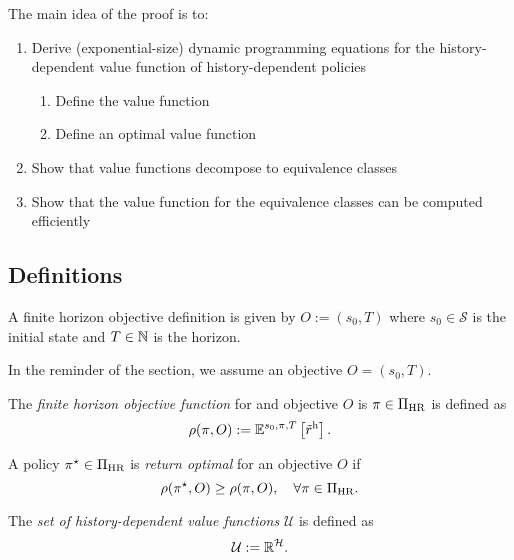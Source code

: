 The main idea of the proof is to:
\begin{enumerate}
\item Derive (exponential-size) dynamic programming equations for the history-dependent value function of history-dependent policies
  \begin{enumerate}
    \item Define the value function
    \item Define an optimal value function
  \end{enumerate}
\item Show that value functions decompose to equivalence classes
\item Show that the value function for the equivalence classes can be computed efficiently
\end{enumerate}

\subsection{Definitions}

\begin{definition} \label{def:ObjectiveFH}
  A finite horizon objective definition is given by $O := (s_0, T)$ where $s_0\in \mathcal{S}$ is the initial state and $T\in \mathbb{N}$ is the horizon.
   \leanok
\end{definition}

In the reminder of the section, we assume an objective $O = (s_0, T)$.
\begin{definition} \label{sec:objective-fh}
  The \emph{finite horizon objective function} for and objective $O$ is $\pi\in \Pi_{\mathrm{HR}}$ is defined as
  \[
    \rho(\pi, O)
    :=
    \mathbb{E}^{s_0, \pi, T} \left[\tilde{r}^{\mathrm{h}} \right].
  \]
   \leanok
\end{definition}

\begin{definition}\label{def:optimal-fh}
  A policy $\pi^{\star}\in \Pi_{\mathrm{HR}}$ is \emph{return optimal} for an objective $O$ if
  \[
   \rho(\pi^{\star}, O) \ge \rho(\pi, O), \quad \forall \pi \in \Pi_{\mathrm{HR}}.
 \]
  \leanok
\end{definition}

\begin{definition} \label{def:values-h}
  The \emph{set of history-dependent value functions} $\mathcal{U}$ is defined as
  \[
   \mathcal{U} := \mathbb{R}^{\mathcal{H}}.
 \]
  \leanok
\end{definition}

